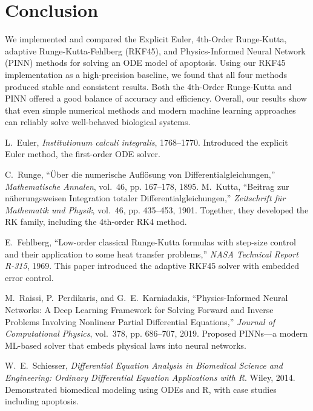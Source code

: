 \documentclass[conference]{IEEEtran}
\begin{document}
\vspace{\bigskipamount}
\vspace{\bigskipamount}
\vspace{\bigskipamount}
\vspace{\bigskipamount}
\vspace{\bigskipamount}
\vspace{\bigskipamount}
\vspace{\bigskipamount}
\vspace{\bigskipamount}
\vspace{\bigskipamount}




\section{Conclusion}
We implemented and compared the Explicit Euler, 4th-Order Runge-Kutta, adaptive Runge-Kutta-Fehlberg (RKF45), and Physics-Informed Neural Network (PINN) methods for solving an ODE model of apoptosis. Using our RKF45 implementation as a high-precision baseline, we found that all four methods produced stable and consistent results. Both the 4th-Order Runge-Kutta and PINN offered a good balance of accuracy and efficiency. Overall, our results show that even simple numerical methods and modern machine learning approaches can reliably solve well-behaved biological systems.\newline

\begin{thebibliography}{00}

L.~Euler, \textit{Institutionum calculi integralis}, 1768–1770.  
Introduced the explicit Euler method, the first-order ODE solver.

C.~Runge, “Über die numerische Auflösung von Differentialgleichungen,” \textit{Mathematische Annalen}, vol.~46, pp. 167–178, 1895.  
M.~Kutta, “Beitrag zur näherungsweisen Integration totaler Differentialgleichungen,” \textit{Zeitschrift für Mathematik und Physik}, vol.~46, pp. 435–453, 1901.  
Together, they developed the RK family, including the 4th-order RK4 method.

E.~Fehlberg, “Low-order classical Runge-Kutta formulas with step-size control and their application to some heat transfer problems,” \textit{NASA Technical Report R-315}, 1969.  
This paper introduced the adaptive RKF45 solver with embedded error control.

M.~Raissi, P.~Perdikaris, and G.~E.~Karniadakis, “Physics-Informed Neural Networks: A Deep Learning Framework for Solving Forward and Inverse Problems Involving Nonlinear Partial Differential Equations,” \textit{Journal of Computational Physics}, vol.~378, pp. 686–707, 2019.  
Proposed PINNs—a modern ML-based solver that embeds physical laws into neural networks.

W.~E.~Schiesser, \textit{Differential Equation Analysis in Biomedical Science and Engineering: Ordinary Differential Equation Applications with R}. Wiley, 2014.  
Demonstrated biomedical modeling using ODEs and R, with case studies including apoptosis.

\end{thebibliography}
\end{document}
